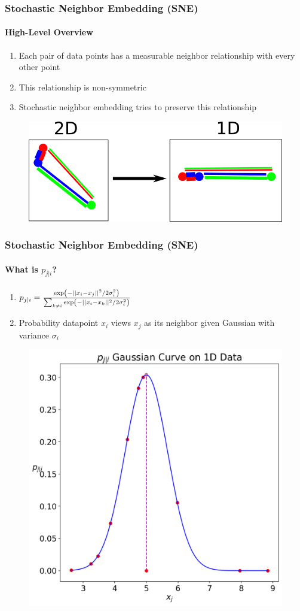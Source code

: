 \documentclass{beamer}
\begin{document}
\begin{frame}
  \frametitle{Stochastic Neighbor Embedding (SNE)}
  \framesubtitle{High-Level Overview}

  \begin{enumerate}
  \item Each pair of data points has a measurable neighbor relationship with every other point

  \item This relationship is non-symmetric

  \item Stochastic neighbor embedding tries to preserve this relationship
  \end{enumerate}

  \begin{figure}
    \centering
    \includegraphics[width=\linewidth]{images/spring.png}
  \end{figure}
\end{frame}

\begin{frame}
  \frametitle{Stochastic Neighbor Embedding (SNE)}
  \framesubtitle{What is $p_{j|i}$?}

  \begin{enumerate}
  \item $p_{j|i} = \frac{\exp\del{-|| x_i - x_j ||^2/2\sigma_i^2}}{\sum_{k \neq i} \exp\del{-|| x_i - x_k ||^2/2\sigma_i^2}}$
  \item Probability datapoint $x_i$ views $x_j$ as its neighbor given Gaussian with variance $\sigma_i$
  \end{enumerate}

  \begin{figure}
    \centering
    \includegraphics[width=0.5\linewidth]{images/gauss/gauss.png}
  \end{figure}
\end{frame}
\end{document}
